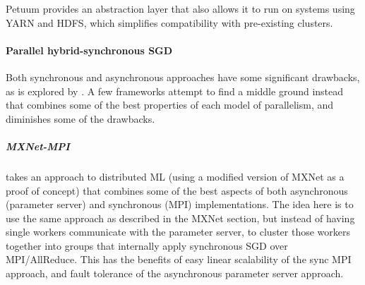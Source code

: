 Petuum provides an abstraction layer that also allows it to run on systems using YARN and HDFS, which simplifies compatibility with pre-existing clusters. 


\paragraph{Parallel hybrid-synchronous SGD}

Both synchronous and asynchronous approaches have some significant drawbacks, as is explored by \citet{ChenJianmin2016}. A few frameworks attempt to find a middle ground instead that combines some of the best properties of each model of parallelism, and diminishes some of the drawbacks.

\subparagraph{MXNet-MPI \citep{Mamidala2018}}

takes an approach to distributed ML (using a modified version of MXNet as a proof of concept) that combines some of the best aspects of both asynchronous (parameter server) and synchronous (MPI) implementations. The idea here is to use the same approach as described in the MXNet section, but instead of having single workers communicate with the parameter server, to cluster those workers together into groups that internally apply synchronous SGD over MPI/AllReduce. This has the benefits of easy linear scalability of the sync MPI approach, and fault tolerance of the asynchronous parameter server approach.


